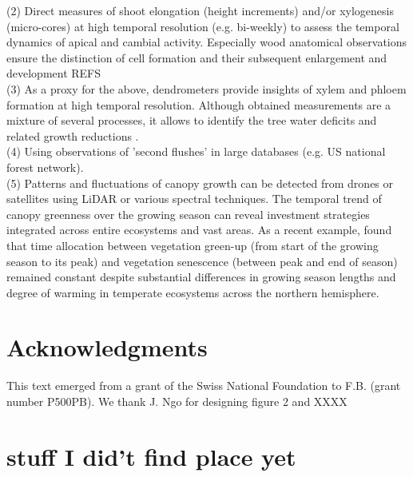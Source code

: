 \documentclass{article}
\begin{document}
	(2) Direct measures of shoot elongation (height increments) and/or xylogenesis (micro-cores) at high temporal resolution (e.g. bi-weekly) to assess the temporal dynamics of apical and cambial activity. Especially wood anatomical observations ensure the distinction of cell formation and their subsequent enlargement and development REFS\\
	
	(3) As a proxy for the above, dendrometers provide insights of xylem and phloem formation at high temporal resolution. Although obtained measurements are a mixture of several processes, it allows to identify the tree water deficits and related growth reductions \cite{etzoldNumberGrowthDays2021, zweifelWhyTreesGrow2021}. \\
	
	(4) Using observations of 'second flushes' in large databases (e.g. US national forest network). \\%
	
	(5) Patterns and fluctuations of canopy growth can be detected from drones or satellites using LiDAR or various spectral techniques. The temporal trend of canopy greenness over the growing season can reveal investment strategies integrated across entire ecosystems and vast areas. As a recent example, \citet{mengConsistentTimeAllocation2024} found that time allocation between vegetation green-up (from start of the growing season to its peak) and vegetation senescence (between peak and end of season) remained constant despite substantial differences in growing season lengths and degree of warming in temperate ecosystems across the northern hemisphere.  %

	

	
\section*{Acknowledgments}
	This text emerged from a grant of the Swiss National Foundation to F.B. (grant number P500PB). We thank J. Ngo for designing figure 2 and XXXX
	
	

	
	\pagebreak
	

	\newpage
\section*{stuff I did't find place yet}
\end{document}
